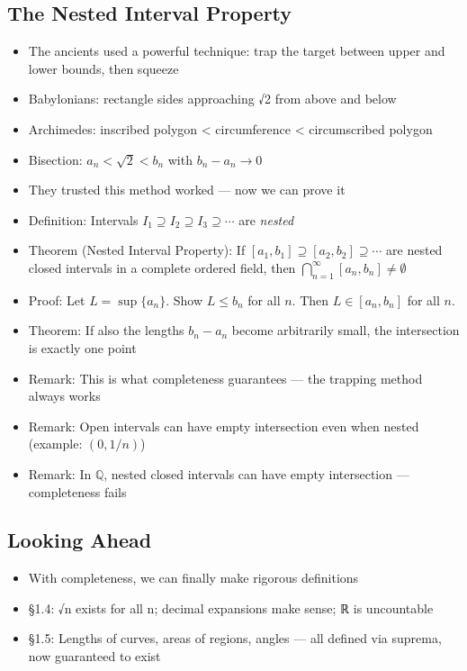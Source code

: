 \documentclass[
  10pt,
  letterpaper,
]{scrbook}
\providecommand{\tightlist}{%
  \setlength{\itemsep}{0pt}\setlength{\parskip}{0pt}}
\newcommand{\QQ}{\mathbb{Q}}
\begin{document}
\subsection{The Nested Interval
Property}\label{the-nested-interval-property}

\begin{itemize}
\tightlist
\item
  The ancients used a powerful technique: trap the target between upper
  and lower bounds, then squeeze
\item
  Babylonians: rectangle sides approaching √2 from above and below
\item
  Archimedes: inscribed polygon \textless{} circumference \textless{}
  circumscribed polygon
\item
  Bisection: \(a_n < \sqrt{2} < b_n\) with \(b_n - a_n \to 0\)
\item
  They trusted this method worked --- now we can prove it
\item
  Definition: Intervals
  \(I_1 \supseteq I_2 \supseteq I_3 \supseteq \cdots\) are \emph{nested}
\item
  Theorem (Nested Interval Property): If
  \([a_1, b_1] \supseteq [a_2, b_2] \supseteq \cdots\) are nested closed
  intervals in a complete ordered field, then
  \(\bigcap_{n=1}^{\infty} [a_n, b_n] \neq \emptyset\)
\item
  Proof: Let \(L = \sup\{a_n\}\). Show \(L \leq b_n\) for all \(n\).
  Then \(L \in [a_n, b_n]\) for all \(n\).
\item
  Theorem: If also the lengths \(b_n - a_n\) become arbitrarily small,
  the intersection is exactly one point
\item
  Remark: This is what completeness guarantees --- the trapping method
  always works
\item
  Remark: Open intervals can have empty intersection even when nested
  (example: \((0, 1/n)\))
\item
  Remark: In \(\QQ\), nested closed intervals can have empty
  intersection --- completeness fails
\end{itemize}

\subsection{Looking Ahead}\label{looking-ahead}

\begin{itemize}
\tightlist
\item
  With completeness, we can finally make rigorous definitions
\item
  §1.4: √n exists for all n; decimal expansions make sense; ℝ is
  uncountable
\item
  §1.5: Lengths of curves, areas of regions, angles --- all defined via
  suprema, now guaranteed to exist
\end{itemize}
\end{document}
